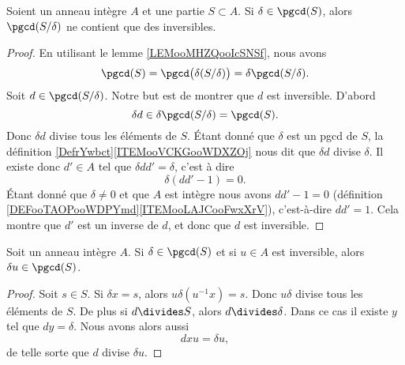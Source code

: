 \begin{lemma}		\label{LEMooZSUNooUmYmgt}
	Soient un anneau intègre \( A\) et une partie \( S\subset A\). Si \( \delta\in\pgcd(S)\), alors \( \pgcd(S/\delta)\) ne contient que des inversibles.
\end{lemma}

\begin{proof}
	En utilisant le lemme \ref{LEMooMHZQooIcSNSf}, nous avons
	\begin{equation}
		\pgcd(S)=\pgcd\big( \delta(S/\delta) \big)=\delta\pgcd(S/\delta).
	\end{equation}
	Soit \( d\in\pgcd(S/\delta)\). Notre but est de montrer que \( d\) est inversible. D'abord
	\begin{equation}
		\delta d\in \delta\pgcd(S/\delta)=\pgcd(S).
	\end{equation}
	Donc \( \delta d\) divise tous les éléments de \( S\). Étant donné que \( \delta\) est un pgcd de \( S\), la définition \ref{DefrYwbct}\ref{ITEMooVCKGooWDXZOj} nous dit que \( \delta d\) divise \( \delta\). Il existe donc \( d'\in A\) tel que \( \delta dd'=\delta\), c'est à dire
	\begin{equation}
		\delta(dd'-1)=0.
	\end{equation}
	Étant donné que \( \delta\neq 0\) et que \( A\) est intègre nous avons \( dd'-1=0\) (définition \ref{DEFooTAOPooWDPYmd}\ref{ITEMooLAJCooFwxXrV}), c'est-à-dire \( dd'=1\). Cela montre que \( d'\) est un inverse de \( d\), et donc que \( d\) est inversible.
\end{proof}

\begin{lemma}		\label{LEMooZKASooKstTuK}
	Soit un anneau intègre \( A\). Si \( \delta\in\pgcd(S)\) et si \( u\in A\) est inversible, alors \( \delta u\in\pgcd(S)\).
\end{lemma}

\begin{proof}
	Soit \( s\in S\). Si \( \delta x=s\), alors \( u\delta (u^{-1} x)=s\). Donc \( u\delta\) divise tous les éléments de \( S\). De plus si \( d\divides S\), alors \( d\divides \delta\). Dans ce cas il existe \( y\) tel que \( dy=\delta\). Nous avons alors aussi
	\begin{equation}
		dxu=\delta u,
	\end{equation}
	de telle sorte que \( d\) divise \( \delta u\).
\end{proof}

